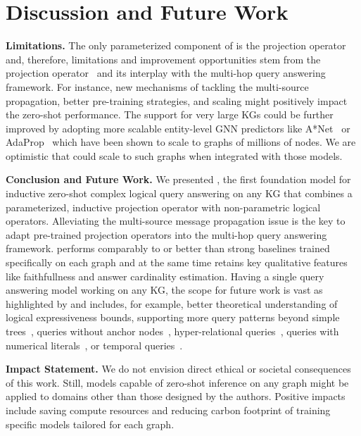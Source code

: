 \section{Discussion and Future Work}
\label{sec:conclusion}

\textbf{Limitations.}
The only parameterized component of \method is the projection operator and, therefore, limitations and improvement opportunities stem from the projection operator~\citep{ultra} and its interplay with the multi-hop query answering framework. 
For instance, new mechanisms of tackling the multi-source propagation, better pre-training strategies, and scaling might positively impact the zero-shot \clqa performance.
The support for very large KGs could be further improved by adopting more scalable entity-level GNN predictors like A*Net~\citep{astarnet} or AdaProp~\citep{adaprop} which have been shown to scale to graphs of millions of nodes. We are optimistic that \method could scale to such graphs  when integrated with those models.

\textbf{Conclusion and Future Work.}
We presented \method, the first foundation model for inductive zero-shot complex logical query answering on any KG that combines a parameterized, inductive projection operator with non-parametric logical operators.
Alleviating the multi-source message propagation issue is the key to adapt pre-trained projection operators into the multi-hop query answering framework.
\method performs comparably to or better than strong baselines trained specifically on each graph and at the same time retains key qualitative features like faithfullness and answer cardinality estimation.
Having a single query answering model working on any KG, the scope for future work is vast as highlighted by \citet{ren2023ngdb} and includes, for example, better theoretical understanding of logical expressiveness bounds, supporting more query patterns beyond simple trees~\citep{efok, fit}, queries without anchor nodes~\citep{egnn_qe}, hyper-relational queries~\citep{starqe}, queries with numerical literals~\citep{demir_litcqd}, or temporal queries~\citep{lin2023tflex}.

\textbf{Impact Statement.}
We do not envision direct ethical or societal consequences of this work. 
Still, models capable of zero-shot inference on any graph might be applied to domains other than those designed by the authors. 
Positive impacts include saving compute resources and reducing carbon footprint of training specific models tailored for each graph.

\vspace{-1em}
